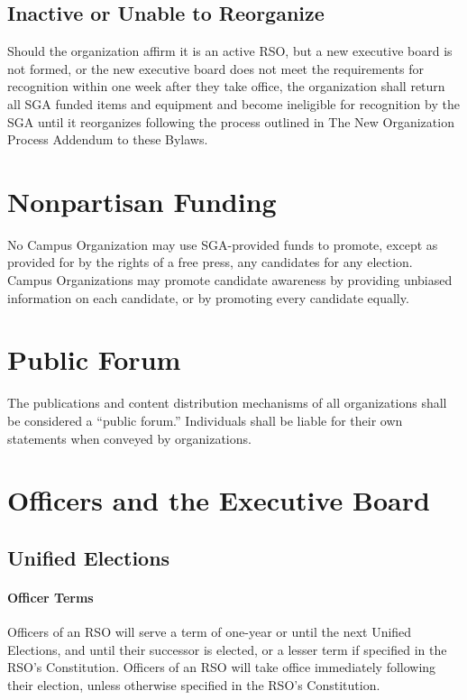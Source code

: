 \documentclass[12pt]{scrreprt}
\begin{document}
\subsection{Inactive or Unable to Reorganize}
Should the organization affirm it is an active RSO, but a new executive board 
is not formed, or the new executive board does not meet the requirements for 
recognition within one week after they take office, the organization shall 
return all SGA funded items and equipment and become ineligible for 
recognition by the SGA until it reorganizes following the process outlined in The New Organization Process Addendum to these Bylaws.

\section{Nonpartisan Funding}
No Campus Organization may use SGA-provided funds to promote, except as 
provided for by the rights of a free press, any candidates for any election. 
Campus Organizations may promote candidate awareness by providing unbiased 
information on each candidate, or by promoting every candidate equally.

\section{Public Forum}
The publications and content distribution mechanisms of all organizations 
shall be considered a ``public forum.'' Individuals shall be liable for their 
own statements when conveyed by organizations.

\section{Officers and the Executive Board}

\subsection{Unified Elections}

\paragraph{Officer Terms}
Officers of an RSO will serve a term of one-year or until the next
Unified Elections, and until their successor is elected, or a lesser
term if specified in the RSO’s Constitution. Officers of an RSO will
take office immediately following their election, unless otherwise
specified in the RSO’s Constitution.
\end{document}
